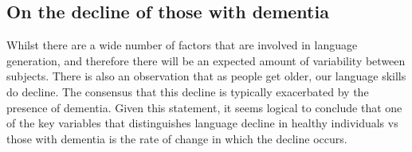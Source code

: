 \documentclass[a4paper]{book}
\begin{document}
\subsection {On the decline of those with dementia} Whilst there are a wide number of factors that are involved in language generation, and therefore there will be an expected amount of variability between subjects. There is also an observation that as people get older, our language skills do decline. The consensus that this decline is typically exacerbated by the presence of dementia. Given this statement, it seems logical to conclude that one of the key variables that distinguishes language decline in healthy individuals vs those with dementia is the rate of change in which the decline occurs.
\end{document}

